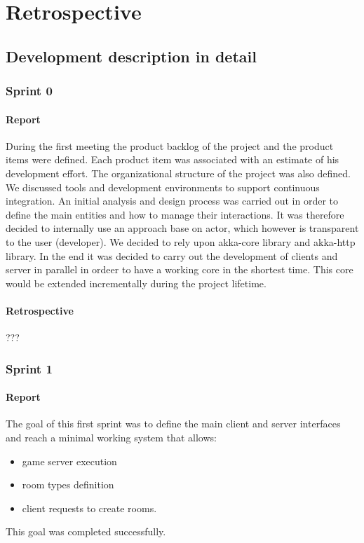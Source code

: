\chapter{Retrospective}

\section{Development description in detail}

\subsection{Sprint 0}
\subsubsection{Report}
During the first meeting the product backlog of the project and the product items were defined. Each product item was associated with an estimate of his development effort.
The organizational structure of the project was also defined. We discussed tools and development environments to support continuous integration.
An initial analysis and design process was carried out in order to define the main entities and how to manage their interactions.
It was therefore decided to internally use an approach base on actor, which however is transparent to the user (developer). 
We decided to rely upon akka-core library and akka-http library. 
In the end it was decided to carry out the development of clients and server in parallel in ordeer to have a working core in the shortest time. This core would be extended incrementally during the project lifetime.

\subsubsection{Retrospective}

???






\subsection{Sprint 1}
\subsubsection{Report}
The goal of this first sprint was to define the main client and server interfaces and reach a minimal working system that allows:
\begin{itemize}
	\item game server execution 
	\item room types definition
	\item client requests to create rooms.
\end{itemize}
This goal was completed successfully. 

